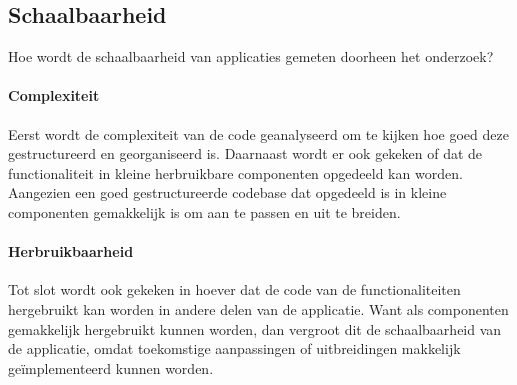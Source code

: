 \subsection{Schaalbaarheid}
Hoe wordt de schaalbaarheid van applicaties gemeten doorheen het onderzoek?

\paragraph{Complexiteit}
Eerst wordt de complexiteit van de code geanalyseerd om te kijken hoe goed deze 
gestructureerd en georganiseerd is. Daarnaast wordt er ook gekeken of dat de 
functionaliteit in kleine herbruikbare componenten opgedeeld kan worden. Aangezien een 
goed gestructureerde codebase dat opgedeeld is in kleine componenten gemakkelijk 
is om aan te passen en uit te breiden.

\paragraph{Herbruikbaarheid}
Tot slot wordt ook gekeken in hoever dat de code van de functionaliteiten hergebruikt kan 
worden in andere delen van de applicatie. Want als componenten gemakkelijk hergebruikt 
kunnen worden, dan vergroot dit de schaalbaarheid van de applicatie, omdat 
toekomstige aanpassingen of uitbreidingen makkelijk geïmplementeerd kunnen worden.
